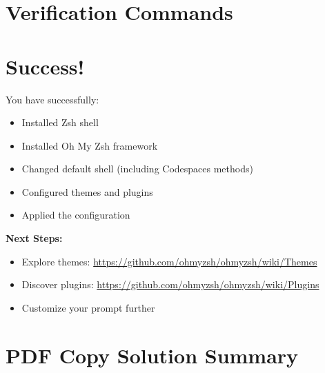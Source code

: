 \documentclass{article}
\begin{document}
\section{Verification Commands}



\section{Success!}

\begin{successbox}
You have successfully:
\begin{itemize}
    \item Installed Zsh shell
    \item Installed Oh My Zsh framework  
    \item Changed default shell (including Codespaces methods)
    \item Configured themes and plugins
    \item Applied the configuration
\end{itemize}

\textbf{Next Steps:}
\begin{itemize}
    \item Explore themes: \url{https://github.com/ohmyzsh/ohmyzsh/wiki/Themes}
    \item Discover plugins: \url{https://github.com/ohmyzsh/ohmyzsh/wiki/Plugins}
    \item Customize your prompt further
\end{itemize}
\end{successbox}

\section{PDF Copy Solution Summary}
\end{document}
